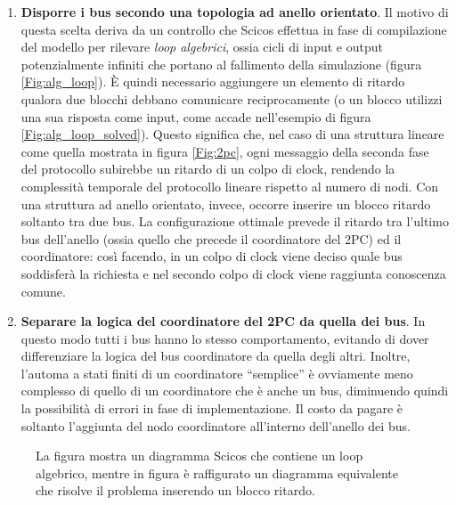 \begin{enumerate}
\item \textbf{Disporre i bus secondo una topologia ad anello orientato}. Il motivo di questa scelta deriva da un controllo che Scicos effettua in fase di compilazione del modello per rilevare \textsl{loop algebrici}, ossia cicli di input e output potenzialmente infiniti che portano al fallimento della simulazione (figura \ref{Fig:alg_loop}). È quindi necessario aggiungere un elemento di ritardo qualora due blocchi debbano comunicare reciprocamente (o un blocco utilizzi una sua risposta come input, come accade nell'esempio di figura \ref{Fig:alg_loop_solved}). Questo significa che, nel caso di una struttura lineare come quella mostrata in figura \ref{Fig:2pc}, ogni messaggio della seconda fase del protocollo subirebbe un ritardo di un colpo di clock, rendendo la complessità temporale del protocollo lineare rispetto al numero di nodi. Con una struttura ad anello orientato, invece, occorre inserire un blocco ritardo soltanto tra due bus. La configurazione ottimale prevede il ritardo tra l'ultimo bus dell'anello (ossia quello che precede il coordinatore del 2PC) ed il coordinatore: così facendo, in un colpo di clock viene deciso quale bus soddisferà la richiesta e nel secondo colpo di clock viene raggiunta conoscenza comune.
\item \textbf{Separare la logica del coordinatore del 2PC da quella dei bus}. In questo modo tutti i bus hanno lo stesso comportamento, evitando di dover differenziare la logica del bus coordinatore da quella degli altri. Inoltre, l'automa a stati finiti di un coordinatore \textquotedblleft semplice\textquotedblright{} è ovviamente meno complesso di quello di un coordinatore che è anche un bus, diminuendo quindi la possibilità di errori in fase di implementazione. Il costo da pagare è soltanto l'aggiunta del nodo coordinatore all'interno dell'anello dei bus.
\end{enumerate}

\begin{figure}
\caption{La figura  mostra un diagramma Scicos che contiene un loop algebrico, mentre in figura  è raffigurato un diagramma equivalente che risolve il problema inserendo un blocco ritardo.}
\label{Fig:loops}
\end{figure}

